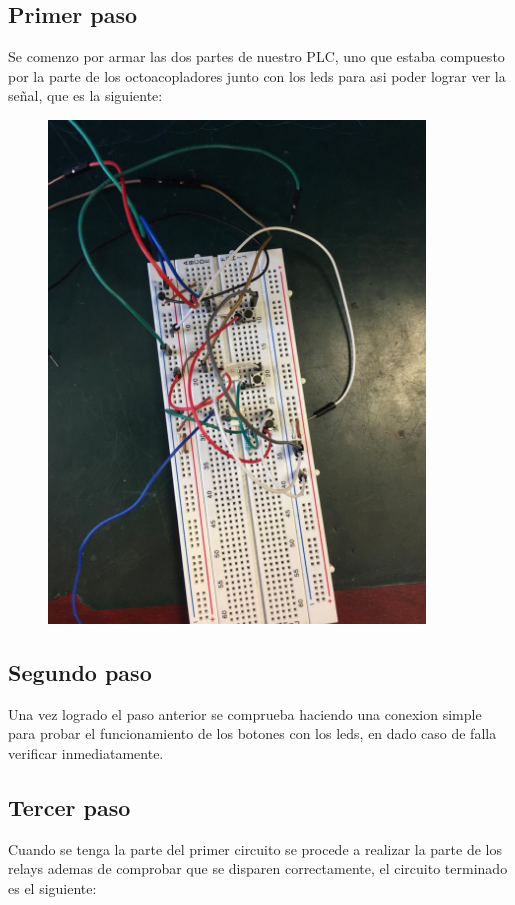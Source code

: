 \documentclass[12pt,a4paper]{article}
\begin{document}
\subsection{Primer paso} Se comenzo por armar las dos partes de nuestro PLC, uno que estaba compuesto por la parte de los octoacopladores junto con los leds para asi poder lograr ver la señal, que es la siguiente:

\begin{figure}[h!]
\centering
  \includegraphics[width=10cm]{IMG-20191004-WA0005.jpg} 
\end{figure}
\newpage

\subsection{Segundo paso} Una vez logrado el paso anterior se comprueba haciendo una conexion simple para probar el funcionamiento de los botones con los leds, en dado caso de falla verificar inmediatamente.

\subsection{Tercer paso} Cuando se tenga la parte del primer circuito se procede a realizar la parte de los relays ademas de comprobar que se disparen correctamente, el circuito terminado es el siguiente:
\end{document}
